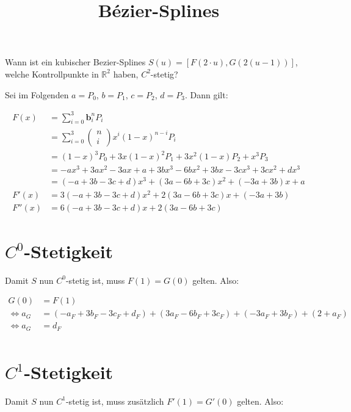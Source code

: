 \documentclass[a4paper]{scrartcl}
\begin{document}
    \title{Bézier-Splines}
    \maketitle

    Wann ist ein kubischer Bezier-Splines $S(u) = [F(2 \cdot u), G(2(u-1))]$,
    welche Kontrollpunkte in $\mathbb{R}^2$ haben, $C^2$-stetig?

    Sei im Folgenden $a = P_0$, $b = P_1$, $c = P_2$, $d= P_3$. Dann gilt:

    \begin{align}
        F(x) &= \sum_{i=0}^3 \mathbf{b}_i^n P_i\\
             &= \sum_{i=0}^3 \begin{pmatrix}n\\i\end{pmatrix} x^{i} (1-x)^{n-i}  P_i\\
             &= (1-x)^3 P_0 + 3 x (1-x)^2 P_1 + 3 x^2 (1-x) P_2 + x^3 P_3\\
             &= -a x^3+3 a x^2-3 a x+a+3 b x^3-6 b x^2+3 b x-3 c x^3+3 c x^2+d x^3\\
             &= (-a + 3 b-3 c+d) x^3  + (3 a-6 b+3 c) x^2 + (-3 a+3 b) x + a\\
        F'(x)&= 3 (-a + 3 b-3 c+d) x^2 + 2 (3 a-6 b+3 c) x + (-3 a+3 b)\\
        F''(x) &= 6 (-a + 3 b-3 c+d) x + 2 (3 a-6 b+3 c)
    \end{align}

    \section{$C^0$-Stetigkeit}
    Damit $S$ nun $C^0$-stetig ist, muss $F(1) = G(0)$ gelten. Also:

    \begin{align}
        G(0) &= F(1)\\
    \Leftrightarrow a_G
        &= (-a_F + 3 b_F-3 c_F+d_F)  + (3 a_F-6 b_F+3 c_F) + (-3 a_F+3 b_F) + (2+a_F)\\
    \Leftrightarrow a_G &= d_F\\
    \end{align}

    \clearpage
    \section{$C^1$-Stetigkeit}
    Damit $S$ nun $C^1$-stetig ist, muss zusätzlich $F'(1) = G'(0)$ gelten. Also:
\end{document}
